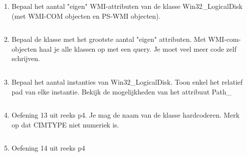 \documentclass[11pt,a4paper]{report}
\begin{document}
\begin{enumerate}[resume]
\begin{lstlisting}
#inhoud van interessante eigenschappen - kan direct worden uitgebreid met systeemattributen
$PSinstantie | select DeviceID, VolumeName, Description
$PSinstantie | select __DERIVATION,DeviceID 

#voor alle instanties (is vrij eenvoudig met PS-WMI-objecten
Get-WmiObject -Class Win32_LogicalDisk | select DeviceID, VolumeName, Description

#syntax is complexer met COM-objecten:
$Location=New-Object -comobject "WbemScripting.SWbemLocator"
$service = $Location.ConnectServer(".","root\cimV2")
#met select en expressies:
$service.InstancesOf("Win32_LogicalDisk")|
select @{Name="DeviceId";Expression={$_.Properties_.Item("DeviceId").Value}}, @{Name="VolumeName:";Expression={$_.Properties_.Item("VolumeName").Value}}, @{Name="Description";Expression={$_.Properties_.Item("Description").Value}}

#met foreach
$service.InstancesOf("Win32_LogicalDisk")|forEach{
	Write-Host "DeviceId=" $_.Properties_.Item("DeviceId").Value " VolumeName:"  $_.Properties_.Item("VolumeName").Value  " Description=" $_.Properties_.Item("Description").Value
}
	\end{lstlisting}
	\item Bepaal het aantal "eigen" WMI-attributen van de klasse Win32\_LogicalDisk (met WMI-COM objecten en PS-WMI objecten).
	\begin{lstlisting}

	\end{lstlisting}
	\item Bepaal de klasse met het grootste aantal "eigen" attributen.
	Met WMI-com-objecten haal je alle klassen op met een query. Je moet veel meer code zelf schrijven.
	\begin{lstlisting}

	\end{lstlisting}
	\item Bepaal het aantal instanties van Win32\_LogicalDisk.
	Toon enkel het relatief pad van elke instantie. Bekijk de mogelijkheden van het attribuut Path\_
	\begin{lstlisting}

	\end{lstlisting}
	\item Oefening 13 uit reeks p4. Je mag de naam van de klasse hardcoderen.
	Merk op dat CIMTYPE niet numeriek is.
	\begin{lstlisting}

	\end{lstlisting}
	\item Oefening 14 uit reeks p4
	\begin{lstlisting}


\end{lstlisting}
\end{enumerate}
\end{document}
